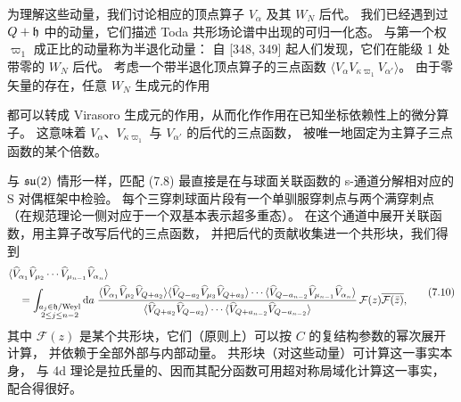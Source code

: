 为理解这些动量，我们讨论相应的顶点算子 $V_\alpha$ 及其 $W_N$ 后代。
我们已经遇到过 $Q+\mathfrak{h}$ 中的动量，它们描述 Toda 共形场论谱中出现的可归一化态。
与第一个权 $\varpi_1$ 成正比的动量称为半退化动量：
自 [348, 349] 起人们发现，它们在能级 1 处带零的 $W_N$ 后代。
考虑一个带半退化顶点算子的三点函数 $\langle V_\alpha V_{\kappa\varpi_1}V_{\alpha'}\rangle$。
由于零矢量的存在，任意 $W_N$ 生成元的作用

都可以转成 Virasoro 生成元的作用，从而化作作用在已知坐标依赖性上的微分算子。
这意味着 $V_\alpha$、$V_{\kappa\varpi_1}$ 与 $V_{\alpha'}$ 的后代的三点函数，
被唯一地固定为主算子三点函数的某个倍数。

与 $\mathfrak{su}(2)$ 情形一样，匹配 (7.8) 最直接是在与球面关联函数的 s-通道分解相对应的 S 对偶框架中检验。
每个三穿刺球面片段有一个单驯服穿刺点与两个满穿刺点
（在规范理论一侧对应于一个双基本表示超多重态）。
在这个通道中展开关联函数，用主算子改写后代的三点函数，
并把后代的贡献收集进一个共形块，我们得到
\begin{equation}
\begin{aligned}
&\langle\widehat{V}_{\alpha_1}\widehat{V}_{\mu_2}\cdots\widehat{V}_{\mu_{n-1}}
\widehat{V}_{\alpha_n}\rangle\\
&\quad=\int_{\substack{a_j\in\mathfrak{h}/\mathrm{Weyl}\\ 2\le j\le n-2}}\mathrm{d} a\;
\frac{\langle\widehat{V}_{\alpha_1}\widehat{V}_{\mu_2}\widehat{V}_{Q+a_2}\rangle
\langle\widehat{V}_{Q-a_2}\widehat{V}_{\mu_3}\widehat{V}_{Q+a_3}\rangle\cdots
\langle\widehat{V}_{Q-a_{n-2}}\widehat{V}_{\mu_{n-1}}\widehat{V}_{\alpha_n}\rangle}
{\langle\widehat{V}_{Q+a_2}\widehat{V}_{Q-a_2}\rangle\cdots
\langle\widehat{V}_{Q+a_{n-2}}\widehat{V}_{Q-a_{n-2}}\rangle}\,
\mathcal{F}(z)\overline{\mathcal{F}(\bar z)},
\end{aligned}
\tag{7.10}
\end{equation}
其中 $\mathcal{F}(z)$ 是某个共形块，它们（原则上）可以按 $C$ 的复结构参数的幂次展开计算，
并依赖于全部外部与内部动量。
共形块（对这些动量）可计算这一事实本身，
与 4d 理论是拉氏量的、因而其配分函数可用超对称局域化计算这一事实，配合得很好。

